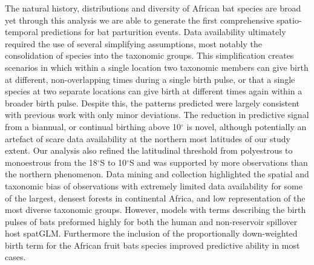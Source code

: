 \documentclass[a4paper,twoside, onecolumn]{article}
\begin{document}
	The natural history, distributions and diversity of African bat species are broad yet through this analysis we are able to generate the first comprehensive spatio-temporal predictions for bat parturition events. Data availability ultimately required the use of several simplifying assumptions, most notably the consolidation of species into the taxonomic groups. This simplification creates scenarios in which within a single location two taxonomic members can give birth at different, non-overlapping times during a single birth pulse, or that a single species at two separate locations can give birth at different times again within a broader birth pulse. Despite this, the patterns predicted were largely consistent with previous work \cite{Cumming1997} with only minor deviations. The reduction in predictive signal from a biannual, or continual birthing above 10$^{\circ}$ is novel, although potentially an artefact of scare data availability at the northern most latitudes of our study extent. Our analysis also refined the latitudinal threshold from polyestrous to monoestrous from the 18$^{\circ}$S to 10$^{\circ}$S and was supported by more observations than the northern phenomenon. Data mining and collection highlighted the spatial and taxonomic bias of observations with extremely limited data availability for some of the largest, densest forests in continental Africa, and low representation of the most diverse taxonomic groups. However, models with terms describing the birth pulses of bats preformed highly for both the human and non-reservoir spillover host spatGLM. Furthermore the inclusion of the proportionally down-weighted birth term for the African fruit bats species improved predictive ability in most cases.\par 
\end{document}
